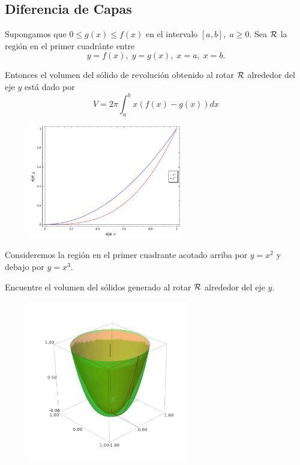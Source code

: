 \subsection{Diferencia de Capas}


Supongamos que $0\leq g(x) \leq f(x)$ en el intervalo $[a,b], \; a \geq 0.$ Sea $\mathcal{R}$ la regi\'on en el primer cuadránte entre $$y=f(x), \; y=g(x), \; x=a, \; x=b.$$ 

Entonces el volumen del s\'olido de revoluci\'on obtenido al rotar $\mathcal{R}$ alrededor del eje $y$ está dado por
\begin{equation}
 \label{FDC}
 \tag{FDC}
 V=2\pi\int_{a}^{b}x\left( f(x)-g(x) \right)dx
\end{equation}




\begin{problema}
\begin{figure}
 \centering
 \includegraphics[height=5cm,keepaspectratio=true]{./calculo/sage0507.png}
 \label{fig:sage:0507}
\end{figure}


 Consideremos la regi\'on en el primer cuadrante acotado arriba por $y=x^{2}$ y debajo por $y=x^{3}.$

Encuentre el volumen del s\'olidos generado al rotar $\mathcal{R}$ alrededor del eje $y.$
\end{problema}




\begin{figure}
 \centering
 \includegraphics[height=7cm,keepaspectratio=true]{./calculo/sage0508.png}
 \label{fig:sage:0508}
\end{figure}



